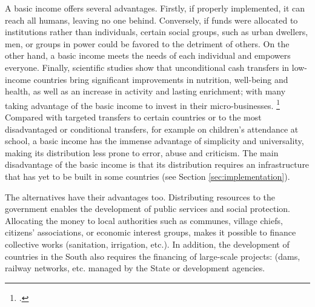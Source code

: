 \documentclass[a5paper,english,openany]{memoir}
\begin{document}
A basic %
income offers several advantages. Firstly, if properly implemented, it can reach all humans, leaving no one behind. Conversely, if funds were allocated to institutions rather than individuals, certain social groups, such as urban dwellers, men, or groups in power %
could be favored %
to the detriment of others. On the other hand, a basic income meets the needs of each individual and empowers everyone. Finally, scientific studies show that unconditional cash transfers in low-income countries bring significant improvements in nutrition, well-being and health, as well as an increase in activity and lasting enrichment; with many taking advantage of the basic income to invest in their micro-businesses.  %
\footnote{\citet{egger_general_2022,haushofer_short-term_2016,standing_little_2014}.} Compared with targeted transfers to certain countries or to the most disadvantaged %
or conditional transfers, for example on children's attendance at school, %
a basic income has the immense advantage of simplicity and universality, making its distribution less prone to error, abuse and criticism. The main disadvantage of the basic income is that its distribution requires an infrastructure that has yet to be built in some countries (see Section \ref{sec:implementation}).  %

The alternatives have their advantages too. Distributing resources to the government enables the development of public services and social protection. Allocating the money to local authorities such as communes, village chiefs, citizens' associations, or economic interest groups,  %
makes it possible to finance collective works (sanitation, irrigation, etc.). %
In addition, the development of countries in the South also requires the financing of large-scale projects: (dams, railway networks, etc. %
managed by the State or development agencies. 
\end{document}
